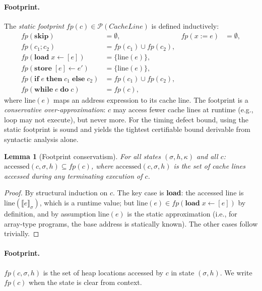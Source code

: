 \documentclass[acmsmall,sigplan,anonymous,review,screen]{acmart}
\theoremstyle{plain}
\newtheorem{lemma}[theorem]{Lemma}
\theoremstyle{definition}
\newcommand{\fp}{\mathit{fp}}
\begin{document}
\paragraph{Footprint.}
The \emph{static footprint} $\fp(c) \in \mathcal{P}(\mathit{CacheLine})$
is defined inductively:
\begin{align*}
  \fp(\mathbf{skip}) &= \emptyset, &
  \fp(x := e) &= \emptyset, \\
  \fp(c_1; c_2) &= \fp(c_1) \cup \fp(c_2), \\
  \fp(\mathbf{load}\; x \leftarrow [e]) &= \{\mathrm{line}(e)\}, \\
  \fp(\mathbf{store}\; [e] \leftarrow e') &= \{\mathrm{line}(e)\}, \\
  \fp(\mathbf{if}\; e\; \mathbf{then}\; c_1\; \mathbf{else}\; c_2) &= \fp(c_1) \cup \fp(c_2), \\
  \fp(\mathbf{while}\; e\; \mathbf{do}\; c) &= \fp(c),
\end{align*}
where $\mathrm{line}(e)$ maps an address expression to its cache line.
The footprint is a \emph{conservative over-approximation}: $c$ may access
fewer cache lines at runtime (e.g., loop may not execute), but never more.
For the timing defect bound, using the static footprint is sound and yields
the tightest certifiable bound derivable from syntactic analysis alone.

\begin{lemma}[Footprint conservatism]
\label{lem:fp-conserv}
  For all states $(\sigma, h, \kappa)$ and all $c$:
  $\mathrm{accessed}(c, \sigma, h) \subseteq \fp(c)$,
  where $\mathrm{accessed}(c, \sigma, h)$ is the set of cache lines
  accessed during any terminating execution of $c$.
\end{lemma}

\begin{proof}
  By structural induction on $c$.  The key case is \textbf{load}: the
  accessed line is $\mathrm{line}(\llbracket e \rrbracket_\sigma)$, which
  is a runtime value; but $\mathrm{line}(e) \in \fp(\mathbf{load}\; x \leftarrow [e])$
  by definition, and by assumption $\mathrm{line}(e)$ is the static
  approximation (i.e., for array-type programs, the base address is
  statically known).  The other cases follow trivially.
\end{proof}

\paragraph{Footprint.}
$\fp(c, \sigma, h)$ is the set of heap locations accessed by $c$ in state
$(\sigma, h)$.  We write $\fp(c)$ when the state is clear from context.
\end{document}
